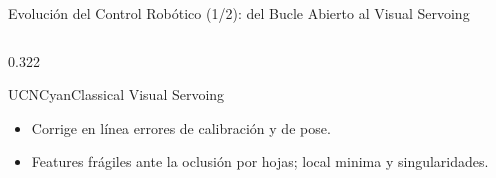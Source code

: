 \documentclass[aspectratio=169,10pt,xcolor={dvipsnames,table}]{beamer}
\newcommand{\FootnoteFont}{\fontsize{5}{6.2}\selectfont}                %
\newcommand{\CardHeightDouble}{42.5mm}     %
\newcommand{\CheckMark}{\textcolor{AgriGreen}{$\checkmark$}}
\newcommand{\CrossMark}{\textcolor{AlertRed}{$\times$}}
\newcommand{\RefNote}[1]{{\FootnoteFont\textcolor{TextDark!65}{\cite{#1}}}}
\begin{document}
\begin{frame}{Evolución del Control Robótico (1/2): del Bucle Abierto al Visual Servoing}
\begin{columns}[T, onlytextwidth]
\begin{column}{0.322\textwidth}
\begin{Card}[height=\CardHeightDouble]{UCNCyan}{Classical Visual Servoing}
{\begin{itemize}
          \item[\CheckMark] Corrige en línea errores de calibración y de pose.
          \item[\CrossMark] Features frágiles ante la oclusión por hojas; local minima y singularidades.
        \end{itemize}
        \RefNote{hutchinson1996tutorial,chaumette2006visual}}
      \end{Card}
    \end{column}
  \end{columns}
\end{frame}

\end{document}
